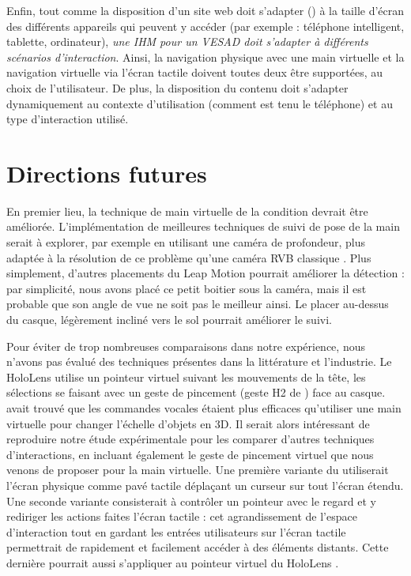 Enfin, tout comme la disposition d'un site web doit s'adapter () à la taille d'écran des différents appareils qui peuvent y accéder (par exemple : téléphone intelligent, tablette, ordinateur), \emph{une IHM pour un VESAD doit s'adapter à différents scénarios d'interaction}. Ainsi, la navigation physique avec une main virtuelle et la navigation virtuelle via l'écran tactile doivent toutes deux être supportées, au choix de l'utilisateur. De plus, la disposition du contenu doit s'adapter dynamiquement au contexte d'utilisation (comment est tenu le téléphone) et au type d'interaction utilisé.


\section{Directions futures}
\label{sec:discussion_future}

En premier lieu, la technique de main virtuelle de la condition  devrait être améliorée. L'implémentation de meilleures techniques de suivi de pose de la main serait à explorer, par exemple en utilisant une caméra de profondeur, plus adaptée à la résolution de ce problème qu'une caméra RVB classique \cite{Taylor2016}. Plus simplement, d'autres placements du Leap Motion pourrait améliorer la détection : par simplicité, nous avons placé ce petit boitier sous la caméra, mais il est probable que son angle de vue ne soit pas le meilleur ainsi. Le placer au-dessus du casque, légèrement incliné vers le sol pourrait améliorer le suivi.

Pour éviter de trop nombreuses comparaisons dans notre expérience, nous n'avons pas évalué des techniques présentes dans la littérature et l'industrie. Le HoloLens utilise un pointeur virtuel suivant les mouvements de la tête, les sélections se faisant avec un geste de pincement (geste H2 de \cite{Piumsomboon2013}) face au casque. \cite{Piumsomboon2014} avait trouvé que les commandes vocales étaient plus efficaces qu'utiliser une main virtuelle pour changer l'échelle d'objets en 3D. Il serait alors intéressant de reproduire notre étude expérimentale pour les comparer d'autres techniques d'interactions, en incluant également le geste de pincement virtuel que nous venons de proposer pour la main virtuelle. Une première variante du  utiliserait l'écran physique comme pavé tactile déplaçant un curseur sur tout l'écran étendu. Une seconde variante consisterait à contrôler un pointeur avec le regard et y rediriger les actions faites l'écran tactile  : cet agrandissement de l'espace d'interaction tout en gardant les entrées utilisateurs sur l'écran tactile permettrait de rapidement et facilement accéder à des éléments distants. Cette dernière pourrait aussi s'appliquer au pointeur virtuel du HoloLens .


